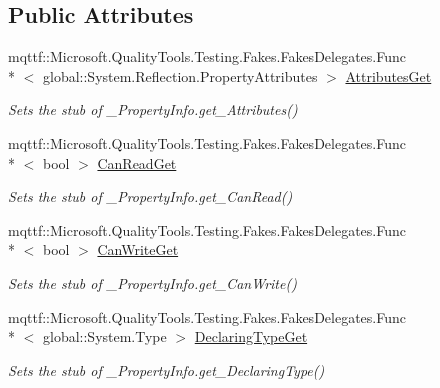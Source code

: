 \subsection*{Public Attributes}
\begin{DoxyCompactItemize}
\item 
mqttf\-::\-Microsoft.\-Quality\-Tools.\-Testing.\-Fakes.\-Fakes\-Delegates.\-Func\\*
$<$ global\-::\-System.\-Reflection.\-Property\-Attributes $>$ \hyperlink{class_system_1_1_runtime_1_1_interop_services_1_1_fakes_1_1_stub___property_info_a7038756bd4a43b0bdd633502df2afba1}{Attributes\-Get}
\begin{DoxyCompactList}\small\item\em Sets the stub of \-\_\-\-Property\-Info.\-get\-\_\-\-Attributes()\end{DoxyCompactList}\item 
mqttf\-::\-Microsoft.\-Quality\-Tools.\-Testing.\-Fakes.\-Fakes\-Delegates.\-Func\\*
$<$ bool $>$ \hyperlink{class_system_1_1_runtime_1_1_interop_services_1_1_fakes_1_1_stub___property_info_a9d0e4972c616781b0dfe508597f4ef35}{Can\-Read\-Get}
\begin{DoxyCompactList}\small\item\em Sets the stub of \-\_\-\-Property\-Info.\-get\-\_\-\-Can\-Read()\end{DoxyCompactList}\item 
mqttf\-::\-Microsoft.\-Quality\-Tools.\-Testing.\-Fakes.\-Fakes\-Delegates.\-Func\\*
$<$ bool $>$ \hyperlink{class_system_1_1_runtime_1_1_interop_services_1_1_fakes_1_1_stub___property_info_ab5e1306f9a62d6c33f25865216537da8}{Can\-Write\-Get}
\begin{DoxyCompactList}\small\item\em Sets the stub of \-\_\-\-Property\-Info.\-get\-\_\-\-Can\-Write()\end{DoxyCompactList}\item 
mqttf\-::\-Microsoft.\-Quality\-Tools.\-Testing.\-Fakes.\-Fakes\-Delegates.\-Func\\*
$<$ global\-::\-System.\-Type $>$ \hyperlink{class_system_1_1_runtime_1_1_interop_services_1_1_fakes_1_1_stub___property_info_a512de1bf6adf323df8dc4621c3047f75}{Declaring\-Type\-Get}
\begin{DoxyCompactList}\small\item\em Sets the stub of \-\_\-\-Property\-Info.\-get\-\_\-\-Declaring\-Type()\end{DoxyCompactList}\item 

\end{DoxyCompactItemize}
